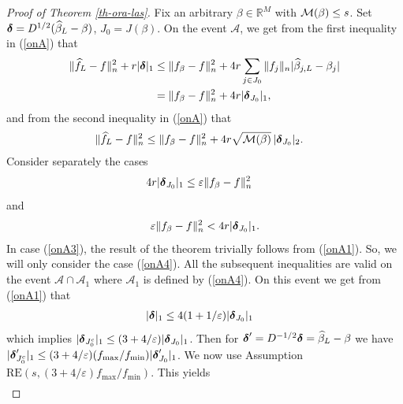 \documentclass[dvips,aos]{imsart}
\numberwithin{equation}{section}
\theoremstyle{plain}
\def\sf{}
\def\wideth{\widehat}
\def\scm{{\cal M}}
\def\wh{\widehat}
\def\eps{\varepsilon}
\def\A{\mbox{$\mathcal A$}}
\def\RR{\mathbb R}
\def\RE#1#2{$\text{RE}(#1,#2)$}
\newcommand{\bD}{\mbox{\boldmath$\delta$}}
\begin{document}
\begin{proof}[Proof of Theorem \ref{th-ora-las}] Fix an arbitrary $\beta\in\RR^M$ with
$\scm(\beta)\le s$. Set $\bD=D^{1/2}(\wh\beta_L-\beta)$,
$J_0=J(\beta)$. On the event $\A$, we get from the first inequality
in (\ref{onA}) that
\begin{equation}\label{onA1}
\begin{split}
\| \wideth f_L - f\|_n^2+r|\bD|_1
 &\le \| {\sf
f}_{\beta} - f\|_n^2 + 4r\sum_{j\in
J_0}\|f_j\|_{n} |\widehat \beta_{j,L} - \beta_j|\\
 & =\| {\sf f}_{\beta} - f\|_n^2 + 4r|\bD_{J_0}|_1,
 \end{split}
\end{equation}
and from the second inequality in (\ref{onA}) that
\begin{equation}\begin{split}\label{onA2}
\| \wideth f_L - f\|_n^2
&\le \| {\sf f}_{\beta} - f\|_n^2 + 4r
\sqrt{\scm(\beta)}\,|\bD_{J_0}|_2.
\end{split}\end{equation}
Consider separately the cases
\begin{equation}\begin{split}\label{onA3}
4r|\bD_{J_0}|_1  &\le \eps\|
 {\sf f}_{\beta} - f\|_n^2
\end{split}\end{equation}
and
\begin{equation}\begin{split}\label{onA4}
\eps \| {\sf f}_{\beta} - f\|_n^2 < 4r|\bD_{J_0}|_1.
\end{split}\end{equation}
In case (\ref{onA3}), the result of the theorem trivially follows
from (\ref{onA1}). So, we will only consider the case (\ref{onA4}).
All the subsequent inequalities are valid on the event $\A\cap \A_1$
where $\A_1$ is defined by (\ref{onA4}). On this event we get from
(\ref{onA1}) that
\begin{equation*}%
\begin{split}
|\bD|_1 &\le 4(1+1/\eps)|\bD_{J_0}|_1
\end{split}
\end{equation*}
which implies $|\bD_{J_0^c}|_1 \le (3+4/\eps)|\bD_{J_0}|_1$. Then
for $\bD'=D^{-1/2}\bD=\wh\beta_L-\beta$ we have $|\bD_{J_0^c}'|_1
\le (3+4/\eps)(f_{\max}/f_{\min})|\bD_{J_0}'|_1$. We now use
Assumption \RE s{(3+4/\eps)f_{\max}/f_{\min}}. This yields
\begin{equation*}%
\begin{split}

\end{split}
\end{equation*}
\end{proof}
\end{document}

